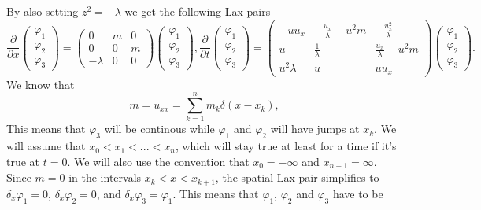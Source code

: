 \documentclass[english,master]{liumaiex}
\theoremstyle{plain}
\theoremstyle{definition}
\begin{document}
By also setting $z^2 = -\lambda$ we get the following Lax pairs
\begin{subequations}
\begin{equation}
\frac{\partial}{\partial x}
\begin{pmatrix} \varphi_1 \\ \varphi_2 \\ \varphi_3 \end{pmatrix} =
\begin{pmatrix}
	0 & m & 0 \\
	0 & 0 & m \\
	-\lambda & 0 & 0
\end{pmatrix}
\begin{pmatrix} \varphi_1 \\ \varphi_2 \\ \varphi_3 \end{pmatrix}
,
\end{equation}
\begin{equation}
\frac{\partial}{\partial t}
\begin{pmatrix} \varphi_1 \\ \varphi_2 \\ \varphi_3 \end{pmatrix} =
\begin{pmatrix}
	-u u_x & -\frac{u_x}{\lambda}-u^2 m & -\frac{u_x^2}{\lambda} \\
	u & \frac{1}{\lambda} & \frac{u_x}{\lambda} - u^2 m \\
	u^2\lambda & u & uu_x
\end{pmatrix}
\begin{pmatrix} \varphi_1 \\ \varphi_2 \\ \varphi_3 \end{pmatrix}
.
\end{equation}
\end{subequations}
%
%
We know that
\begin{equation}
	m = u_{xx} = \sum_{k=1}^n m_k \delta(x - x_k),
\end{equation}
This means that $\varphi_3$ will be continous while $\varphi_1$ and $\varphi_2$ will have jumps at $x_k$.
We will assume that $x_0 < x_1 < ... < x_n$, which will stay true at least for a time if it's true at $t = 0$. We will also use the convention that $x_0 = -\infty$ and $x_{n+1} = \infty$. Since $m = 0$ in the intervals $x_k < x < x_{k+1}$, the spatial Lax pair simplifies to $\delta_x \varphi_1 = 0$, $\delta_x \varphi_2 = 0$, and $\delta_x \varphi_3 = \varphi_1$. This means that $\varphi_1$, $\varphi_2$ and $\varphi_3$ have to be
\end{document}
